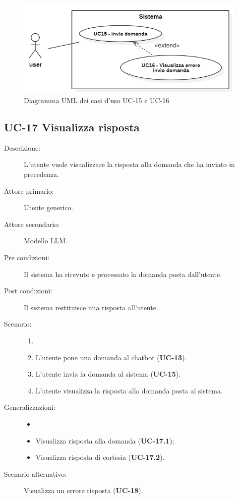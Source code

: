 \begin{figure}[H]
    \centering
    \includegraphics[width=\linewidth]{UC15-16.png} %
    \caption{Diagramma UML dei casi d'uso UC-15 e UC-16}
    \label{fig:UC18-19}
\end{figure}

\subsection{UC-17 Visualizza risposta}
\begin{description}
    \item[Descrizione:] L'utente vuole visualizzare la risposta alla domanda che ha inviato in precedenza.
    \item[Attore primario:] Utente generico.
    \item[Attore secondario:] Modello LLM. 
    \item[Pre condizioni:] Il sistema ha ricevuto e processato la domanda posta dall'utente.
    \item[Post condizioni:] Il sistema restituisce una risposta all'utente.
    \item[Scenario:]
    \begin{enumerate}
        \item[]
        \item L’utente pone una domanda al chatbot (\textbf{UC-13}).
        \item L'utente invia la domanda al sistema (\textbf{UC-15}).
        \item L'utente visualizza la risposta alla domanda posta al sistema.
    \end{enumerate}
    \item[Generalizzazioni:]
    \begin{itemize}
        \item[] 
        \item Visualizza risposta alla domanda (\textbf{UC-17.1});
        \item Visualizza risposta di cortesia (\textbf{UC-17.2}).
    \end{itemize}
    \item[Scenario alternativo:] Visualizza un errore risposta (\textbf{UC-18}).
\end{description}

